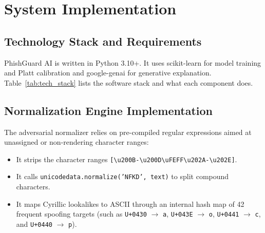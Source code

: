 \documentclass[conference]{IEEEtran}
\begin{document}
\section{System Implementation}
\label{sec:impl}

\subsection{Technology Stack and Requirements}
PhishGuard AI is written in Python 3.10+. It uses scikit-learn for model training and Platt calibration and google-genai for generative explanation. Table~\ref{tab:tech_stack} lists the software stack and what each component does.

\begin{table}[!t]
\caption{Technologies, Libraries and Their Functions.}
\label{tab:tech_stack}
\centering\footnotesize
{}
\end{table}

\subsection{Normalization Engine Implementation}
The adversarial normalizer relies on pre-compiled regular expressions aimed at unassigned or non-rendering character ranges:
\begin{itemize}
    \item It strips the character ranges \texttt{[\textbackslash u200B-\textbackslash u200D\textbackslash uFEFF\textbackslash u202A-\textbackslash u202E]}.
    \item It calls \texttt{unicodedata.normalize('NFKD', text)} to split compound characters.
    \item It maps Cyrillic lookalikes to ASCII through an internal hash map of 42 frequent spoofing targets (such as \texttt{U+0430} $\rightarrow$ \texttt{a}, \texttt{U+043E} $\rightarrow$ \texttt{o}, \texttt{U+0441} $\rightarrow$ \texttt{c}, and \texttt{U+0440} $\rightarrow$ \texttt{p}).
\end{itemize}
\end{document}

